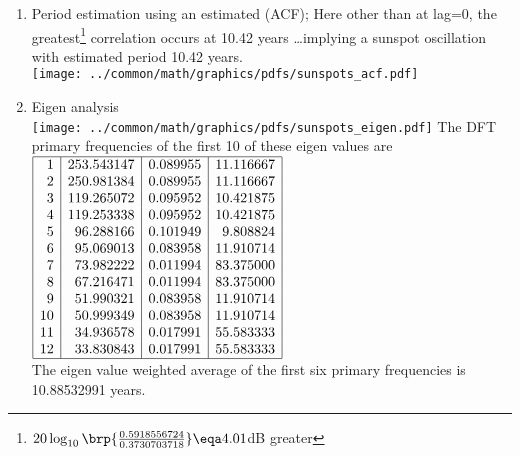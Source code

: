 \begin{example}
\begin{enumerate}
\item Period estimation using an estimated  (ACF);
Here other than at lag=0, the greatest\footnote{$20\log_{10}\brp{\frac{0.5918556724}{0.3730703718}}\eqa4.01$dB greater}
 correlation occurs at 10.42 years \ldots implying a sunspot oscillation with estimated period 10.42 years.
\\\texttt{[image: ../common/math/graphics/pdfs/sunspots\_acf.pdf]}

\item Eigen analysis
\\\texttt{[image: ../common/math/graphics/pdfs/sunspots\_eigen.pdf]}
The DFT primary frequencies of the first 10 of these eigen values are
\\$\begin{array}{|r|r|r|r|}
  \hline
     1 & 253.543147 &  0.089955 & 11.116667 
  \\ 2 & 250.981384 &  0.089955 & 11.116667 
  \\ 3 & 119.265072 &  0.095952 & 10.421875 
  \\ 4 & 119.253338 &  0.095952 & 10.421875 
  \\ 5 &  96.288166 &  0.101949 &  9.808824 
  \\ 6 &  95.069013 &  0.083958 & 11.910714 
  \\ 7 &  73.982222 &  0.011994 & 83.375000 
  \\ 8 &  67.216471 &  0.011994 & 83.375000 
  \\ 9 &  51.990321 &  0.083958 & 11.910714 
  \\10 &  50.999349 &  0.083958 & 11.910714 
  \\11 &  34.936578 &  0.017991 & 55.583333 
  \\12 &  33.830843 &  0.017991 & 55.583333 
  \\\hline
\end{array}$
\\
The eigen value weighted average of the first six primary frequencies is 10.88532991 years.
\end{enumerate}
\end{example}

